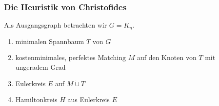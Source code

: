 \begin{frame}
    \frametitle{Die Heuristik von Christofides}
    Als Ausgangsgraph betrachten wir $G = K_n$.
    \begin{enumerate}
        \item minimalen Spannbaum $T$ von $G$ 
        \item kostenminimales, perfektes Matching $M$ auf den Knoten von $T$ mit ungeradem Grad
        \item Eulerkreis $E$ auf $M \dot{\cup} T$
        \item Hamiltonkreis $H$ aus Eulerkreis $E$
    \end{enumerate}
\end{frame}